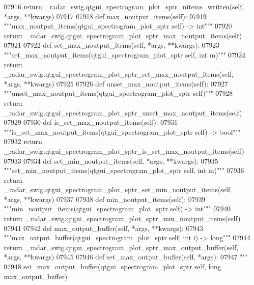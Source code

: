\begin{DoxyCode}
{{{{{{{{{{{{{{{{{{{{{{{{{{07916         \textcolor{keywordflow}{return} \_radar\_swig.qtgui\_spectrogram\_plot\_sptr\_nitems\_written(self, *args, **kwargs)
07917 
07918     \textcolor{keyword}{def }max_noutput_items(self):
07919         \textcolor{stringliteral}{"""max\_noutput\_items(qtgui\_spectrogram\_plot\_sptr self) -> int"""}
07920         \textcolor{keywordflow}{return} \_radar\_swig.qtgui\_spectrogram\_plot\_sptr\_max\_noutput\_items(self)
07921 
07922     \textcolor{keyword}{def }set_max_noutput_items(self, *args, **kwargs):
07923         \textcolor{stringliteral}{"""set\_max\_noutput\_items(qtgui\_spectrogram\_plot\_sptr self, int m)"""}
07924         \textcolor{keywordflow}{return} \_radar\_swig.qtgui\_spectrogram\_plot\_sptr\_set\_max\_noutput\_items(self, *args, **kwargs)
07925 
07926     \textcolor{keyword}{def }unset_max_noutput_items(self):
07927         \textcolor{stringliteral}{"""unset\_max\_noutput\_items(qtgui\_spectrogram\_plot\_sptr self)"""}
07928         \textcolor{keywordflow}{return} \_radar\_swig.qtgui\_spectrogram\_plot\_sptr\_unset\_max\_noutput\_items(self)
07929 
07930     \textcolor{keyword}{def }is_set_max_noutput_items(self):
07931         \textcolor{stringliteral}{"""is\_set\_max\_noutput\_items(qtgui\_spectrogram\_plot\_sptr self) -> bool"""}
07932         \textcolor{keywordflow}{return} \_radar\_swig.qtgui\_spectrogram\_plot\_sptr\_is\_set\_max\_noutput\_items(self)
07933 
07934     \textcolor{keyword}{def }set_min_noutput_items(self, *args, **kwargs):
07935         \textcolor{stringliteral}{"""set\_min\_noutput\_items(qtgui\_spectrogram\_plot\_sptr self, int m)"""}
07936         \textcolor{keywordflow}{return} \_radar\_swig.qtgui\_spectrogram\_plot\_sptr\_set\_min\_noutput\_items(self, *args, **kwargs)
07937 
07938     \textcolor{keyword}{def }min_noutput_items(self):
07939         \textcolor{stringliteral}{"""min\_noutput\_items(qtgui\_spectrogram\_plot\_sptr self) -> int"""}
07940         \textcolor{keywordflow}{return} \_radar\_swig.qtgui\_spectrogram\_plot\_sptr\_min\_noutput\_items(self)
07941 
07942     \textcolor{keyword}{def }max_output_buffer(self, *args, **kwargs):
07943         \textcolor{stringliteral}{"""max\_output\_buffer(qtgui\_spectrogram\_plot\_sptr self, int i) -> long"""}
07944         \textcolor{keywordflow}{return} \_radar\_swig.qtgui\_spectrogram\_plot\_sptr\_max\_output\_buffer(self, *args, **kwargs)
07945 
07946     \textcolor{keyword}{def }set_max_output_buffer(self, *args):
07947         \textcolor{stringliteral}{"""}
07948 \textcolor{stringliteral}{        set\_max\_output\_buffer(qtgui\_spectrogram\_plot\_sptr self, long max\_output\_buffer)}
}}}}}}}}}}}}}}}}}}}}}}}}}}
\end{DoxyCode}
